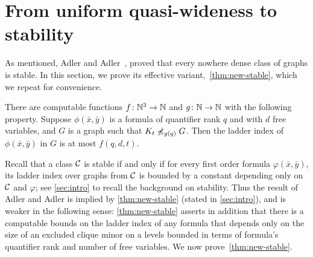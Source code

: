 
\section{From uniform quasi-wideness to stability}\label{sec:stable}
As mentioned, Adler and Adler~\cite{adler2014interpreting}, 
proved that every nowhere dense class of graphs is stable. In this section,
we prove its effective variant,~\cref{thm:new-stable}, which 
we repeat for convenience.
\setcounter{theorem}{1}
\begin{theorem}
  There are computable functions $f\colon \N^3\to\N$ and $g\colon\N\to\N$ with the following property.
Suppose $\phi(\bar x,\bar y)$ is a formula of quantifier rank $q$ and with $d$ free variables,
and $G$ is a graph such that $K_t\not\minor_{g(q)} G$. Then the ladder index of $\phi(\bar x,\bar y)$ in $G$ is at most $f(q,d,t)$.
\end{theorem}



Recall that a class $\cal C$ is stable if and only if for every first order formula $\varphi(\bar x,\bar y)$, its ladder index over graphs from $\cal C$ is bounded by a constant depending only on $\cal C$ and $\varphi$;
see \cref{sec:intro} to recall the background on stability.
Thus the result of Adler and Adler is implied by \cref{thm:new-stable} (stated in \cref{sec:intro}), and is weaker in the following sense: \cref{thm:new-stable} asserts in addition that there is a computable bounds on the ladder index
of any formula that depends only on the size of an excluded clique minor on a levels bounded in terms of formula's quantifier rank and number of free variables. 
We now prove~\cref{thm:new-stable}.

